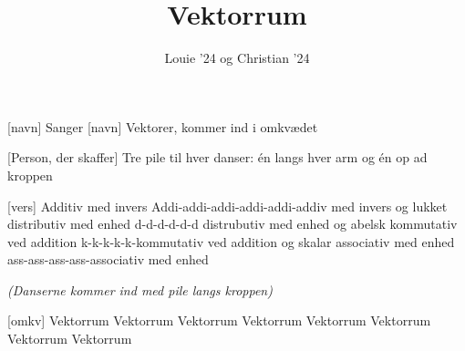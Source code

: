 \documentclass[a4paper,11pt]{article}
\title{Vektorrum}
\author{Louie '24 og Christian '24}
\begin{document}
\maketitle
\enlargethispage{3\baselineskip}

\begin{roles}
[navn] Sanger
[navn] Vektorer, kommer ind i omkvædet
\end{roles}

\begin{props}
[Person, der skaffer] Tre pile til hver danser: én langs hver arm og én op ad kroppen
\end{props}


\begin{song}
  [vers] Additiv med invers
  Addi-addi-addi-addi-addi-addiv med invers
  og lukket
  distributiv med enhed
  d-d-d-d-d-d distrubutiv med enhed
  og abelsk
  kommutativ ved addition
  k-k-k-k-k-kommutativ ved addition
  og skalar
  associativ med enhed
  ass-ass-ass-ass-associativ med enhed

  {\it (Danserne kommer ind med pile langs kroppen)}

  [omkv] Vektorrum
  Vektorrum
  Vektorrum
  Vektorrum
  Vektorrum
  Vektorrum
  Vektorrum
  Vektorrum
\end{song}
\end{document}
